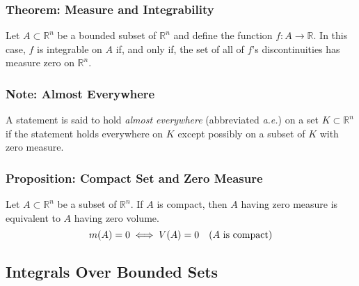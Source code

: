 \documentclass[11pt, a4paper]{article}
\begin{document}
\subsubsection{Theorem: Measure and Integrability}
Let $ A \subset \mathbb{R}^n $ be a bounded subset of $ \mathbb{R}^n $ and define the function $ f : A  \rightarrow \mathbb{R} $. In this case, $ f $ is integrable on $ A $ if, and only if, the set of all of $ f $'s discontinuities has measure zero on $ \mathbb{R}^n $.

\subsubsection{Note: Almost Everywhere}
A statement is said to hold \textit{almost everywhere} (abbreviated \textit{a.e.}) on a set $ K \subset \mathbb{R}^n $ if the statement holds everywhere on $ K $ except possibly on a subset of $ K $ with zero measure.

\subsubsection{Proposition: Compact Set and Zero Measure}
Let $ A  \subset \mathbb{R}^n $ be a subset of $ \mathbb{R}^n $. If $ A $ is compact, then $ A $ having zero measure is equivalent to $ A $ having zero volume.
\begin{equation*}
	m(A) = 0 \iff V(A) = 0 \quad \text{($ A $ is compact)}
\end{equation*}

\subsection{Integrals Over Bounded Sets}
\end{document}
